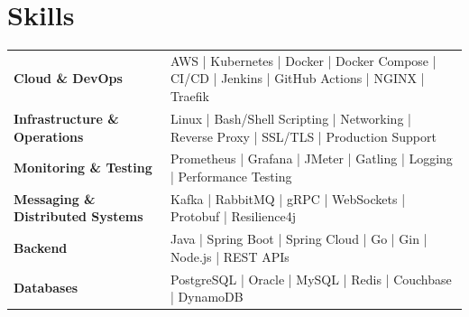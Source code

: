 \section*{Skills}
\BigDivider
\vspace{-6pt}
\small

\noindent
\begingroup
\setlength{\tabcolsep}{4pt} %
\renewcommand{\arraystretch}{1.2}

\begin{tabular}{@{}p{3.4cm} p{15cm}}
\textbf{Cloud \& DevOps} & AWS \;|\; Kubernetes \;|\; Docker \;|\; Docker Compose \;|\; CI/CD \;|\; Jenkins \;|\; GitHub Actions \;|\; NGINX \;|\; Traefik \\

\textbf{Infrastructure \& Operations} & Linux \;|\; Bash/Shell Scripting \;|\; Networking \;|\; Reverse Proxy \;|\; SSL/TLS \;|\; Production Support \\

\textbf{Monitoring \& Testing} & Prometheus \;|\; Grafana \;|\; JMeter \;|\; Gatling \;|\; Logging \;|\; Performance Testing \\

\textbf{Messaging \& Distributed Systems} & Kafka \;|\; RabbitMQ \;|\; gRPC \;|\; WebSockets \;|\; Protobuf \;|\; Resilience4j \\

\textbf{Backend} & Java \;|\; Spring Boot \;|\; Spring Cloud \;|\; Go \;|\; Gin \;|\; Node.js \;|\; REST APIs \\

\textbf{Databases} & PostgreSQL \;|\; Oracle \;|\; MySQL \;|\; Redis \;|\; Couchbase \;|\; DynamoDB \\
\end{tabular}
\endgroup
\normalsize
